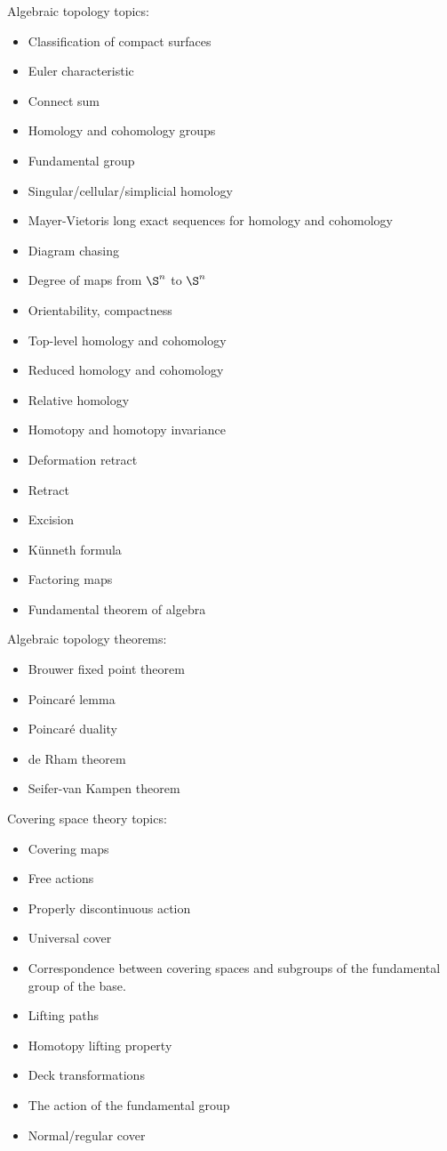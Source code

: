 \documentclass[10pt]{article}
\numberwithin{equation}{subsection}
\begin{document}
Algebraic topology topics:
\begin{itemize}
\item Classification of compact surfaces
\item Euler characteristic
\item Connect sum
\item Homology and cohomology groups
\item Fundamental group
\item Singular/cellular/simplicial homology
\item Mayer-Vietoris long exact sequences for homology and cohomology
\item Diagram chasing
\item Degree of maps from $\S^n$ to $\S^n$
\item Orientability, compactness
\item Top-level homology and cohomology
\item Reduced homology and cohomology
\item Relative homology
\item Homotopy and homotopy invariance
\item Deformation retract
\item Retract
\item Excision
\item K\"unneth formula
\item Factoring maps
\item Fundamental theorem of algebra
\end{itemize}

Algebraic topology theorems:
\begin{itemize}
\item Brouwer fixed point theorem
\item Poincar\'e lemma
\item Poincar\'e duality
\item de Rham theorem
\item Seifer-van Kampen theorem
\end{itemize}

Covering space theory topics:
\begin{itemize}
\item Covering maps
\item Free actions
\item Properly discontinuous action
\item Universal cover
\item Correspondence between covering spaces and subgroups of the fundamental
group of the base.
\item Lifting paths
\item Homotopy lifting property
\item Deck transformations
\item The action of the fundamental group
\item Normal/regular cover
\end{itemize}
\end{document}
